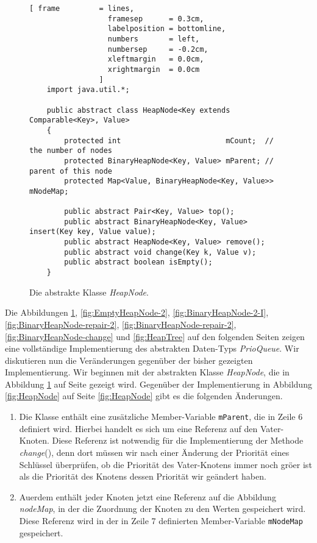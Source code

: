 \begin{figure}[!h]
  \centering
\begin{Verbatim}[ frame         = lines, 
                  framesep      = 0.3cm, 
                  labelposition = bottomline,
                  numbers       = left,
                  numbersep     = -0.2cm,
                  xleftmargin   = 0.0cm,
                  xrightmargin  = 0.0cm
                ]
    import java.util.*;
    
    public abstract class HeapNode<Key extends Comparable<Key>, Value>
    {
        protected int                        mCount;  // the number of nodes
        protected BinaryHeapNode<Key, Value> mParent; // parent of this node
        protected Map<Value, BinaryHeapNode<Key, Value>> mNodeMap;
    
        public abstract Pair<Key, Value> top();    
        public abstract BinaryHeapNode<Key, Value> insert(Key key, Value value);
        public abstract HeapNode<Key, Value> remove();
        public abstract void change(Key k, Value v);
        public abstract boolean isEmpty();
    }
\end{Verbatim}
\vspace*{-0.3cm}
  \caption{Die abstrakte Klasse \textsl{HeapNode}.}
  \label{fig:HeapNode-2}
\end{figure}

Die Abbildungen \ref{fig:HeapNode-2},  \ref{fig:EmptyHeapNode-2},
\ref{fig:BinaryHeapNode-2-I},  \ref{fig:BinaryHeapNode-repair-2},
\ref{fig:BinaryHeapNode-repair-2}, \ref{fig:BinaryHeapNode-change} und \ref{fig:HeapTree} 
auf den folgenden Seiten zeigen eine vollst\"andige
Implementierung des abstrakten Daten-Typs \textsl{PrioQueue}.  Wir diskutieren nun die
Ver\"anderungen gegen\"uber der bisher gezeigten Implementierung.  
Wir beginnen mit der abstrakten Klasse \textsl{HeapNode}, die in Abbildung
\ref{fig:HeapNode-2} auf Seite \pageref{fig:HeapNode-2} gezeigt wird.
Gegen\"uber der Implementierung in Abbildung \ref{fig:HeapNode} auf Seite \ref{fig:HeapNode}
gibt es die folgenden Änderungen.
\begin{enumerate}
\item Die Klasse enth\"alt eine zus\"atzliche Member-Variable \texttt{mParent}, die in Zeile 6
      definiert wird.  Hierbei handelt es sich um eine Referenz auf den Vater-Knoten.
      Diese Referenz ist notwendig f\"ur die Implementierung der Methode \textsl{change}(),
      denn dort m\"ussen wir nach einer Änderung der Priorit\"at eines Schl\"ussel \"uberpr\"ufen, 
      ob die Priorit\"at des Vater-Knotens immer noch gr\"o\3er ist als die Priorit\"at des Knotens dessen
      Priorit\"at wir ge\"andert haben.
\item Au\3erdem enth\"alt jeder Knoten jetzt eine Referenz auf die Abbildung
      \textsl{nodeMap}, in der die Zuordnung der Knoten zu den Werten gespeichert wird.
      Diese Referenz wird in der in Zeile 7 definierten Member-Variable \texttt{mNodeMap}
      gespeichert.
\end{enumerate}

